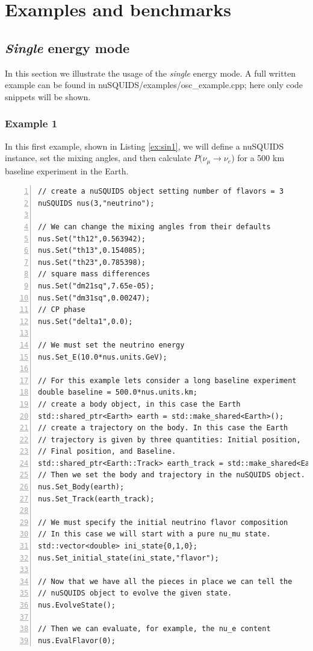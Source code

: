 \documentclass[3p,12pt,authoryear]{elsarticle}
\newcommand{\ttf}{\ttfamily}
\begin{document}
\section{Examples and benchmarks} 
\label{sec:examples} 

\subsection{{\it Single} energy mode}

In this section we illustrate the usage of the {\it single} energy mode. A full written example can be found in {\ttf nuSQUIDS/examples/osc\_example.cpp}; here only code snippets will be shown.

\subsubsection{Example 1}

In this first example, shown in Listing \ref{ex:sin1}, we will define a {\ttf nuSQUIDS} instance, set the mixing angles, and then calculate $P(\nu_\mu \to \nu_e$) for a 500 km baseline experiment in the Earth.

\begin{lstlisting}[frame=leftline, numbers = left,breaklines=true, label = ex:sin1]
// create a nuSQUIDS object setting number of flavors = 3
nuSQUIDS nus(3,"neutrino");

// We can change the mixing angles from their defaults
nus.Set("th12",0.563942);
nus.Set("th13",0.154085);
nus.Set("th23",0.785398);
// square mass differences
nus.Set("dm21sq",7.65e-05);
nus.Set("dm31sq",0.00247);
// CP phase
nus.Set("delta1",0.0);

// We must set the neutrino energy
nus.Set_E(10.0*nus.units.GeV);

// For this example lets consider a long baseline experiment
double baseline = 500.0*nus.units.km;
// create a body object, in this case the Earth
std::shared_ptr<Earth> earth = std::make_shared<Earth>();
// create a trajectory on the body. In this case the Earth
// trajectory is given by three quantities: Initial position,
// Final position, and Baseline.
std::shared_ptr<Earth::Track> earth_track = std::make_shared<Earth::Track>(0.0,baseline,baseline);
// Then we set the body and trajectory in the nuSQUIDS object.
nus.Set_Body(earth);
nus.Set_Track(earth_track);

// We must specify the initial neutrino flavor composition
// In this case we will start with a pure nu_mu state.
std::vector<double> ini_state{0,1,0};
nus.Set_initial_state(ini_state,"flavor");

// Now that we have all the pieces in place we can tell the
// nuSQUIDS object to evolve the given state.
nus.EvolveState();

// Then we can evaluate, for example, the nu_e content
nus.EvalFlavor(0);

\end{lstlisting}
\end{document}
